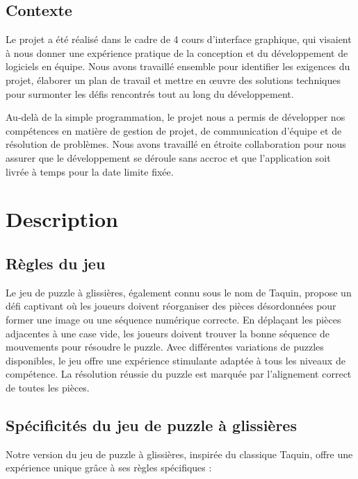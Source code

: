 \documentclass[a4paper,10pt]{article}
\begin{document}
\subsection{Contexte}
Le projet a été réalisé dans le cadre de 4 cours d'interface graphique, qui visaient à nous donner une expérience pratique de la conception et du développement de logiciels en équipe. Nous avons travaillé ensemble pour identifier les exigences du projet, élaborer un plan de travail et mettre en œuvre des solutions techniques pour surmonter les défis rencontrés tout au long du développement.

Au-delà de la simple programmation, le projet nous a permis de développer nos compétences en matière de gestion de projet, de communication d'équipe et de résolution de problèmes. Nous avons travaillé en étroite collaboration pour nous assurer que le développement se déroule sans accroc et que l'application soit livrée à temps pour la date limite fixée.

\newpage

\section{Description}

\subsection{Règles du jeu}
Le jeu de puzzle à glissières, également connu sous le nom de Taquin, propose un défi captivant où les joueurs doivent réorganiser des pièces désordonnées pour former une image ou une séquence numérique correcte. En déplaçant les pièces adjacentes à une case vide, les joueurs doivent trouver la bonne séquence de mouvements pour résoudre le puzzle. Avec différentes variations de puzzles disponibles, le jeu offre une expérience stimulante adaptée à tous les niveaux de compétence. La résolution réussie du puzzle est marquée par l'alignement correct de toutes les pièces.

\subsection{Spécificités du jeu de puzzle à glissières}

Notre version du jeu de puzzle à glissières, inspirée du classique Taquin, offre une expérience unique grâce à ses règles spécifiques :
\end{document}
